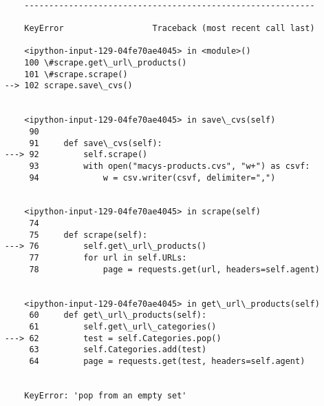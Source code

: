 \documentclass[11pt]{article}
\begin{document}
    \begin{Verbatim}[commandchars=\\\{\}]

        -----------------------------------------------------------

        KeyError                  Traceback (most recent call last)

        <ipython-input-129-04fe70ae4045> in <module>()
        100 \#scrape.get\_url\_products()
        101 \#scrape.scrape()
    --> 102 scrape.save\_cvs()
    

        <ipython-input-129-04fe70ae4045> in save\_cvs(self)
         90 
         91     def save\_cvs(self):
    ---> 92         self.scrape()
         93         with open("macys-products.cvs", "w+") as csvf:
         94             w = csv.writer(csvf, delimiter=",")


        <ipython-input-129-04fe70ae4045> in scrape(self)
         74 
         75     def scrape(self):
    ---> 76         self.get\_url\_products()
         77         for url in self.URLs:
         78             page = requests.get(url, headers=self.agent)


        <ipython-input-129-04fe70ae4045> in get\_url\_products(self)
         60     def get\_url\_products(self):
         61         self.get\_url\_categories()
    ---> 62         test = self.Categories.pop()
         63         self.Categories.add(test)
         64         page = requests.get(test, headers=self.agent)


        KeyError: 'pop from an empty set'

    \end{Verbatim}


    
    
    
    
\end{document}
